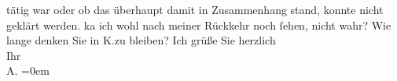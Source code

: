\begin{ledgroupsized}[t]{13cm}
{{{                  tätig war oder ob das überhaupt damit in Zusammenhang stand, konnte nicht geklärt werden.}}}\label{K_L02976-2h} ka{\geminationn} ich wohl nach meiner Rückkehr noch ſehen,
               nicht wahr? Wie lange denken Sie in K.zu bleiben?\pend
           \pstart
           Ich grüße Sie herzlich {\\[\baselineskip]}Ihr {\\[\baselineskip]}\spacefill\mbox{A.}\pend
           \leftskip=0em{}
         
         \endnumbering{}\end{ledgroupsized}  \newcommand{\dateiname}{L02976}\newcommand{\titel}{Arthur Schnitzler an Felix Salten, [26. 6. 1902]}\newcommand{\editorInnen}{Martin Anton Müller und Laura Untner}
      